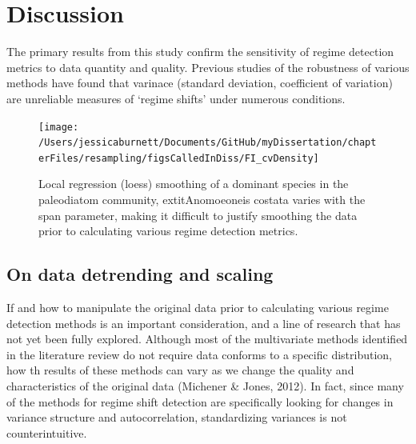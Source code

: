 \documentclass[12pt,twoside,openany]{reedthesis}
\begin{document}
\hypertarget{discussion-4}{%
\section{Discussion}\label{discussion-4}}

The primary results from this study confirm the sensitivity of regime detection metrics to data quantity and quality. Previous studies of the robustness of various methods have found that varinace (standard deviation, coefficient of variation) are unreliable measures of `regime shifts' under numerous conditions.
\begin{figure}
\texttt{[image: /Users/jessicaburnett/Documents/GitHub/myDissertation/chapterFiles/resampling/figsCalledInDiss/FI\_cvDensity]} \caption{Local regression (loess) smoothing of a dominant species in the paleodiatom community,     extit{Anomoeoneis costata} varies with the span parameter, making it difficult to justify smoothing the data prior to calculating various regime detection metrics.}\label{fig:loessEx}
\end{figure}
\hypertarget{on-data-detrending-and-scaling}{%
\subsection{On data detrending and scaling}\label{on-data-detrending-and-scaling}}

If and how to manipulate the original data prior to calculating various regime detection methods is an important consideration, and a line of research that has not yet been fully explored. Although most of the multivariate methods identified in the literature review do not require data conforms to a specific distribution, how th results of these methods can vary as we change the quality and characteristics of the original data (Michener \& Jones, 2012). In fact, since many of the methods for regime shift detection are specifically looking for changes in variance structure and autocorrelation, standardizing variances is not counterintuitive.
\end{document}
